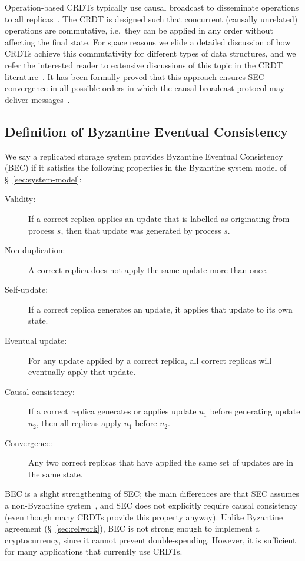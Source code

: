 \documentclass[a4paper,anonymous,USenglish]{lipics-v2019}
\begin{document}
Operation-based CRDTs typically use causal broadcast to disseminate operations to all replicas~\cite{Gomes:2017gy,Shapiro:2011}.
The CRDT is designed such that concurrent (causally unrelated) operations are commutative, i.e.\ they can be applied in any order without affecting the final state.
For space reasons we elide a detailed discussion of how CRDTs achieve this commutativity for different types of data structures, and we refer the interested reader to extensive discussions of this topic in the CRDT literature~\cite{Shapiro:2011wy,Weiss:2009ht}.
It has been formally proved that this approach ensures SEC convergence in all possible orders in which the causal broadcast protocol may deliver messages~\cite{Gomes:2017gy}.

\subsection{Definition of Byzantine Eventual Consistency}

We say a replicated storage system provides Byzantine Eventual Consistency (BEC) if it satisfies the following properties in the Byzantine system model of \S~\ref{sec:system-model}:

\begin{description}
\item[Validity:] If a correct replica applies an update that is labelled as originating from process $s$, then that update was generated by process $s$.
\item[Non-duplication:] A correct replica does not apply the same update more than once.
\item[Self-update:] If a correct replica generates an update, it applies that update to its own state.
\item[Eventual update:] For any update applied by a correct replica, all correct replicas will eventually apply that update.
\item[Causal consistency:] If a correct replica generates or applies update $u_1$ before generating update $u_2$, then all replicas apply $u_1$ before $u_2$.
\item[Convergence:] Any two correct replicas that have applied the same set of updates are in the same state.
\end{description}

BEC is a slight strengthening of SEC; the main differences are that SEC assumes a non-Byzantine system~\cite{Shapiro:2011}, and SEC does not explicitly require causal consistency (even though many CRDTs provide this property anyway).
Unlike Byzantine agreement (\S~\ref{sec:relwork}), BEC is not strong enough to implement a cryptocurrency, since it cannot prevent double-spending.
However, it is sufficient for many applications that currently use CRDTs.
\end{document}
